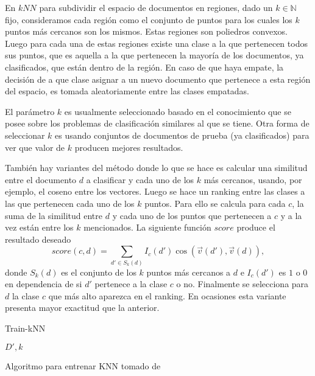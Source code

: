 \documentclass{llncs}
\begin{document}
		En $kNN$ para subdividir el espacio de documentos en regiones, dado un $k \in \mathbb{N}$ fijo, consideramos cada regi\'on como el conjunto de puntos para los cuales los $k$ puntos m\'as cercanos son los mismos. Estas regiones son poliedros convexos. Luego para cada una de estas regiones existe una clase a la que pertenecen todos sus puntos, que es aquella a la que pertenecen la mayor\'ia de los documentos, ya clasificados, que est\'an dentro de la regi\'on. En caso de que haya empate, la decisi\'on de a que clase asignar a un nuevo documento que pertenece a esta regi\'on del espacio, es tomada aleatoriamente entre las clases empatadas.
		
		El par\'ametro $k$ es usualmente seleccionado basado en el conocimiento que se posee sobre los problemas de clasificaci\'on similares al que se tiene. Otra forma de seleccionar $k$ es usando conjuntos de documentos de prueba (ya clasificados) para ver que valor de $k$ producen mejores resultados.
		
		Tambi\'en hay variantes del m\'etodo donde lo que se hace es calcular una similitud entre el documento $d$ a clasificar y cada uno de los $k$ m\'as cercanos, usando, por ejemplo, el coseno entre los vectores. Luego se hace un ranking entre las clases a las que pertenecen cada uno de los $k$ puntos. Para ello se calcula para cada $c$, la suma de la similitud entre $d$ y cada uno de los puntos que pertenecen a $c$ y a la vez est\'an entre los $k$ mencionados. La siguiente funci\'on $score$ produce el resultado deseado
		\[
			score(c,d)  = \sum_{d'\in S_k(d)} I_c(d') \cos(\overrightarrow{v}(d'),\overrightarrow{v}(d)),
		\]
		donde $S_k(d)$ es el conjunto de los $k$ puntos m\'as cercanos a $d$ e $I_c(d')$ es $1$ o $0$ en dependencia de si $d'$ pertenece a la clase $c$ o no. Finalmente se selecciona para $d$ la clase $c$ que m\'as alto aparezca en el ranking. En ocasiones esta variante presenta mayor exactitud que la anterior.
		
		
		\begin{algorithm}{}
			\caption{Train-kNN}
			\begin{algorithmic}[1]
				
				\State \textbf{\Return} $D', k$
			\end{algorithmic}
			
			\smallskip
			\tiny{Algoritmo para entrenar KNN tomado de \cite[Figura 14.7]{B1}}
		\end{algorithm}
		
\end{document}
